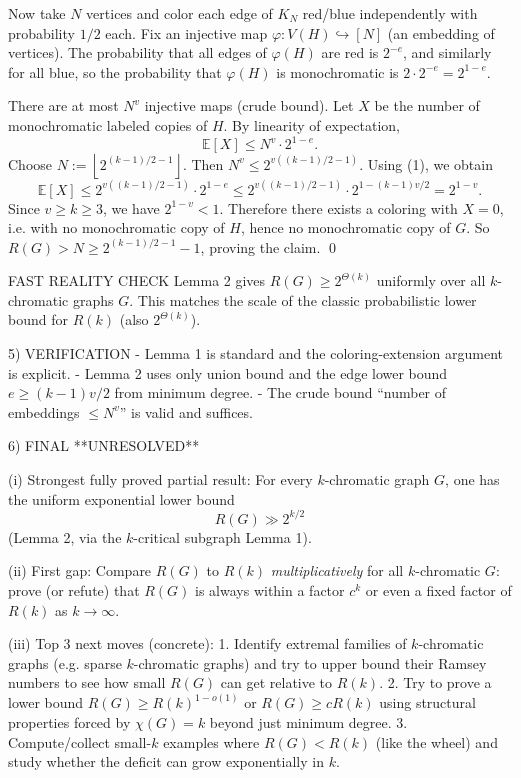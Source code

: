 Now take $N$ vertices and color each edge of $K_N$ red/blue independently with probability $1/2$ each.
Fix an injective map $\varphi:V(H)\hookrightarrow [N]$ (an embedding of vertices). The probability that all edges of $\varphi(H)$ are red is $2^{-e}$,
and similarly for all blue, so the probability that $\varphi(H)$ is monochromatic is $2\cdot 2^{-e}=2^{1-e}$.

There are at most $N^v$ injective maps (crude bound).
Let $X$ be the number of monochromatic labeled copies of $H$.
By linearity of expectation,
\[\mathbb E[X]\le N^v \cdot 2^{1-e}.\]
Choose $N:=\left\lfloor 2^{(k-1)/2-1}\right\rfloor$.
Then $N^v \le 2^{v((k-1)/2-1)}$.
Using (1), we obtain
\[\mathbb E[X]\le 2^{v((k-1)/2-1)}\cdot 2^{1-e}\le 2^{v((k-1)/2-1)}\cdot 2^{1-(k-1)v/2}=2^{1-v}.\]
Since $v\ge k\ge 3$, we have $2^{1-v}<1$.
Therefore there exists a coloring with $X=0$, i.e. with no monochromatic copy of $H$, hence no monochromatic copy of $G$.
So $R(G)>N\ge 2^{(k-1)/2-1}-1$, proving the claim. \qed

FAST REALITY CHECK
Lemma 2 gives $R(G)\ge 2^{\Theta(k)}$ uniformly over all $k$-chromatic graphs $G$.
This matches the scale of the classic probabilistic lower bound for $R(k)$ (also $2^{\Theta(k)}$).

5) VERIFICATION
- Lemma 1 is standard and the coloring-extension argument is explicit.
- Lemma 2 uses only union bound and the edge lower bound $e\ge (k-1)v/2$ from minimum degree.
- The crude bound ``number of embeddings $\le N^v$'' is valid and suffices.

6) FINAL
**UNRESOLVED**

(i) Strongest fully proved partial result:
For every $k$-chromatic graph $G$, one has the uniform exponential lower bound
\[R(G)\gg 2^{k/2}\]
(Lemma 2, via the $k$-critical subgraph Lemma 1).

(ii) First gap:
Compare $R(G)$ to $R(k)$ \emph{multiplicatively} for all $k$-chromatic $G$:
prove (or refute) that $R(G)$ is always within a factor $c^k$ or even a fixed factor of $R(k)$ as $k\to\infty$.

(iii) Top 3 next moves (concrete):
1. Identify extremal families of $k$-chromatic graphs (e.g. sparse $k$-chromatic graphs) and try to upper bound their Ramsey numbers to see how small $R(G)$ can get relative to $R(k)$.
2. Try to prove a lower bound $R(G)\ge R(k)^{1-o(1)}$ or $R(G)\ge cR(k)$ using structural properties forced by $\chi(G)=k$ beyond just minimum degree.
3. Compute/collect small-$k$ examples where $R(G)<R(k)$ (like the wheel) and study whether the deficit can grow exponentially in $k$.

